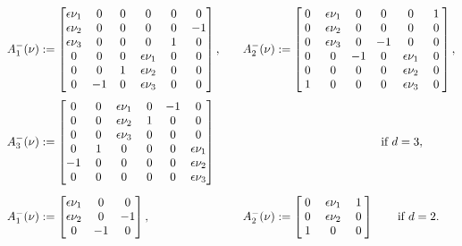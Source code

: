 \documentclass[twoside,11pt]{article}
\numberwithin{equation}{section}
\newcommand\w[1]{\makebox[1em]{$#1$}}
\begin{document}
	\begin{alignat}{5}
		\nonumber
		&A_1^-(\nu):=\begin{bmatrix}
			\epsilon \nu_1 & 0 &0 &0 & 0 &0 \\
			\epsilon \nu_2 & 0 &0& 0 & 0 &-1 \\
			\epsilon \nu_3 & 0 &0& 0 & 1 &0 \\
			0 & 0 &0 &\epsilon \nu_1 & 0 &0 \\
			0 & 0 &1 &\epsilon \nu_2 & 0 &0 \\
			\w{0} & \w{-1} &\w{0}&\w{\epsilon \nu_3} & \w{0} &\w{0}
		\end{bmatrix},
		\quad
&&		A_2^-(\nu):=\begin{bmatrix}
			0 & \epsilon \nu_1 &0 &0 & 0 &1 \\
			0 & \epsilon \nu_2 &0& 0 & 0 &0 \\
			0 & \epsilon \nu_3 &0& -1 & 0 &0 \\
			\w{0} &\w{0} & \w{-1} &\w{0} & \w{\epsilon \nu_1} &\w{0}\\
			0 & 0 &0 &0 & \epsilon \nu_2 &0 \\
			1 & 0 &0 &0 & \epsilon \nu_3 &0
		\end{bmatrix},
		\\[1mm]
		&A_3^-(\nu):=\begin{bmatrix}
			\w{0} &\w{0} &\w{\epsilon \nu_1} & \w{0} & \w{-1} &\w{0}\\
			0 & 0 &\epsilon \nu_2& 1& 0 &0\\
			0 & 0 &\epsilon \nu_3& 0 & 0 &0 \\
			0 & 1 &0 &0 & 0 &\epsilon \nu_1 \\
			-1 & 0 &0 &0 & 0 &\epsilon \nu_2 \\
			0 & 0 &0& 0 & 0 &\epsilon \nu_3
		\end{bmatrix}&&\hspace*{11.8em} \textrm{if }d=3,
		\label{A-:def.3D}	\\[2mm]
	\label{A-:def.2D}
&	A_1^-(\nu):=\begin{bmatrix}
		\epsilon \nu_1 & 0 &0 \\
		\epsilon \nu_2 & 0 &-1 \\
		\w{0} & -1 &0
	\end{bmatrix},
	\quad
&&	A_2^-(\nu):=\begin{bmatrix}
		0 & \epsilon \nu_1  &1 \\
		0 & \epsilon \nu_2 &0 \\
		\w{1} & \w{0} &\w{0}
	\end{bmatrix} \qquad \textrm{if }d=2.
\end{alignat}	
\end{document}
